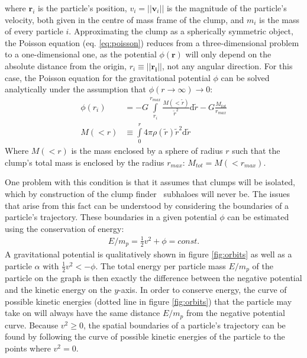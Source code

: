 where $\mathbf{r}_i$ is the particle's position, $v_i = ||\mathbf{v}_i||$ is the magnitude of the particle's velocity, both given in the centre of mass frame of the clump, and $m_i$ is the mass of every particle $i$.
Approximating the clump as a spherically symmetric object, the Poisson equation (eq. \eqref{eq:poisson}) reduces from a three-dimensional problem to a one-dimensional one, as the potential $\phi(\mathbf{r})$ will only depend on the absolute distance from the origin, $r_i \equiv ||\mathbf{r_i}||$, not any angular direction.
For this case, the Poisson equation for the gravitational potential $\phi$ can be solved analytically under the assumption that $\phi(r\rightarrow\infty) \rightarrow 0$:
%
\begin{align}
	\phi (r_i) &=  - G \int\limits_{r_i}^{r_{max}} \frac{M(<\tilde{r})}{\tilde{r}^2} \mathrm{d}\tilde{r}
	- G  \frac{M_{tot}}{r_{max}}
	\label{eq:sol_phi}\\
%
	 M(<r) & \equiv \int\limits_0^r 4 \pi \rho(\tilde{r})\tilde{r}^2 \mathrm{d}\tilde{r}
\end{align}
%
Where $M(<r)$ is the mass enclosed by a sphere of radius $r$ such that the clump's total mass is enclosed by the radius $r_{max}$: $M_{tot} = M(<r_{max})$.




One problem with this condition is that it assumes that clumps will be isolated, which by construction of the clump finder \phew\ subhaloes will never be.
The issues that arise from this fact can be understood by considering the boundaries of a particle's trajectory.
These boundaries in a given potential $\phi$ can be estimated using the conservation of energy:
%
\begin{align}
	E/m_p = \frac{1}{2} v^2 + \phi = const.
\end{align}
%
A gravitational potential is qualitatively shown in figure \ref{fig:orbits} as well as a particle $\alpha$ with $\frac{1}{2}v^2 < - \phi$.
The total energy per particle mass $E/m_p$ of the particle on the graph is then exactly the difference between the negative potential and the kinetic energy on the $y$-axis.
In order to conserve energy, the curve of possible kinetic energies (dotted line in figure \ref{fig:orbits}) that the particle may take on will always have the same distance $E/m_p$ from the negative potential curve.
Because $v^2\geq 0$, the spatial boundaries of a particle's trajectory can be found by following the curve of possible kinetic energies of the particle to the points where $v^2 = 0$.

